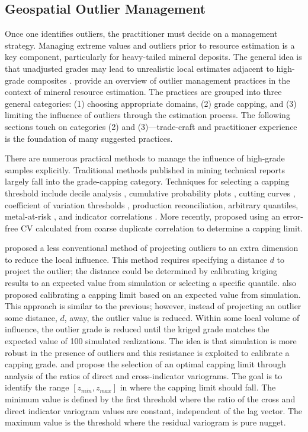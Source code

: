 \FloatBarrier
\subsection{Geospatial Outlier Management}
\label{subsec:01outliermanage}

Once one identifies outliers, the practitioner must decide on a management strategy. Managing extreme values and outliers prior to resource estimation is a key component, particularly for heavy-tailed mineral deposits. The general idea is that unadjusted grades may lead to unrealistic local estimates adjacent to high-grade composites \citep{nowak2013suggestions}. \cite{leuangthong2015dealing} provide an overview of outlier management practices in the context of mineral resource estimation. The practices are grouped into three general categories: (1) choosing appropriate domains, (2) grade capping, and (3) limiting the influence of outliers through the estimation process. The following sections touch on categories (2) and (3)—trade-craft and practitioner experience is the foundation of many suggested practices.

There are numerous practical methods to manage the influence of high-grade samples explicitly. Traditional methods published in mining technical reports largely fall into the grade-capping category. Techniques for selecting a capping threshold include decile analysis \citep{parrish1997geologist}, cumulative probability plots \citep{rossi2013mineral}, cutting curves \citep{roscoe1996cutting}, coefficient of variation thresholds \citep{parker1991statistical}, production reconciliation, arbitrary quantiles, metal-at-risk \citep{parker2006}, and indicator correlations \citep{nowak2019optimal}. More recently, \cite{dutaut2021new} proposed using an error-free \gls{CV} calculated from coarse duplicate correlation to determine a capping limit.

\cite{babakhani2014geostatistical} proposed a less conventional method of projecting outliers to an extra dimension to reduce the local influence. This method requires specifying a distance $d$ to project the outlier; the distance could be determined by calibrating kriging results to an expected value from simulation or selecting a specific quantile. \cite{babakhani2014geostatistical} also proposed calibrating a capping limit based on an expected value from simulation. This approach is similar to the previous; however, instead of projecting an outlier some distance, $d$, away, the outlier value is reduced. Within some local volume of influence, the outlier grade is reduced until the kriged grade matches the expected value of 100 simulated realizations. The idea is that simulation is more robust in the presence of outliers and this resistance is exploited to calibrate a capping grade. \cite{rivoirard2013topcut} and \cite{maleki2014capping} propose the selection of an optimal capping limit through analysis of the ratios of direct and cross-indicator variograms. The goal is to identify the range $[z_{min}, z_{max}]$ in where the capping limit should fall. The minimum value is defined by the first threshold where the ratio of the cross and direct indicator variogram values are constant, independent of the lag vector. The maximum value is the threshold where the residual variogram is pure nugget.

